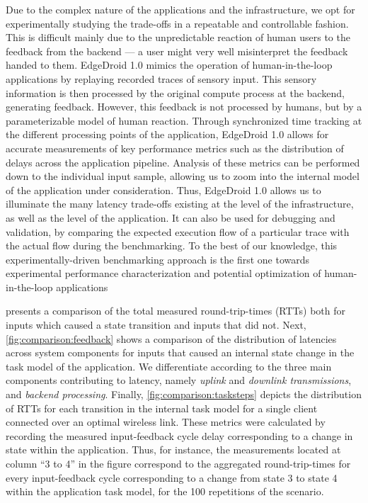 Due to the complex nature of the applications and the infrastructure, we opt for experimentally studying the trade-offs in a repeatable and controllable fashion.
This is difficult mainly due to the unpredictable reaction of human users to the feedback from the backend --- a user might very well misinterpret the feedback handed to them.
EdgeDroid 1.0 mimics the operation of human-in-the-loop applications by replaying recorded traces of sensory input.
This sensory information is then processed by the original compute process at the backend, generating feedback.
However, this feedback is not processed by humans, but by a parameterizable model of human reaction.
Through synchronized time tracking at the different processing points of the application, EdgeDroid 1.0 allows for accurate measurements of key performance metrics such as the distribution of delays across the application pipeline.
Analysis of these metrics can be performed down to the individual input sample, allowing us to zoom into the internal model of the application under consideration.
Thus, EdgeDroid 1.0 allows us to illuminate the many latency trade-offs existing at the level of the infrastructure, as well as the level of the application.
It can also be used for debugging and validation, by comparing the expected execution flow of a particular trace with the actual flow during the benchmarking.
To the best of our knowledge, this experimentally-driven benchmarking approach is the first one towards experimental performance characterization and potential optimization of human-in-the-loop applications

 presents a comparison of the total measured round-trip-times (RTTs) both for inputs which caused a state transition and inputs that did not.
Next, \cref{fig:comparison:feedback} shows a comparison of the distribution of latencies across system components for inputs that caused an internal state change in the task model of the application.
We differentiate according to the three main components contributing to latency, namely \emph{uplink} and \emph{downlink transmissions}, and \emph{backend processing}.
Finally, \cref{fig:comparison:tasksteps} depicts the distribution of RTTs for each transition in the internal task model for a single client connected over an optimal wireless link.
These metrics were calculated by recording the measured input-feedback cycle delay corresponding to a change in state within the application.
Thus, for instance, the measurements located at column ``3 to 4'' in the figure correspond to the aggregated round-trip-times for every input-feedback cycle corresponding to a change from state 3 to state 4 within the application task model, for the 100 repetitions of the scenario.

